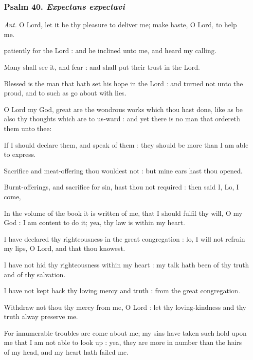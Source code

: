 \subsubsection{Psalm 40. \textit{Expectans expectavi}}\par\noindent
\textit{Ant.} O Lord, {\dag} let it be thy pleasure to deliver me; make haste, O Lord, to help me.\par
{} patiently for the Lord : and he inclined unto me, and heard my calling.\par
{}
Many shall see it, and fear : and shall put their trust in the Lord.\par
{}Blessed is the man that hath set his hope in the Lord : and turned not unto the proud, and to such as go about with lies.\par
{}O Lord my God, great are the wondrous works which thou hast done, like as be also thy thoughts which are to us-ward : and yet there is no man that ordereth them unto thee:\par
{}If I should declare them, and speak of them : they should be more than I am able to express.\par
{}Sacrifice and meat-offering thou wouldest not : but mine ears hast thou opened.\par
{}Burnt-offerings, and sacrifice for sin, hast thou not required : then said I, Lo, I come,\par
{}In the volume of the book it is written of me, that I should fulfil thy will, O my God : I am content to do it; yea, thy law is within my heart.\par
{}I have declared thy righteousness in the great congregation : lo, I will not refrain my lips, O Lord, and that thou knowest.\par
{}I have not hid thy righteousness within my heart : my talk hath been of thy truth and of thy salvation.\par
{}I have not kept back thy loving mercy and truth : from the great congregation.\par
{}Withdraw not thou thy mercy from me, O Lord : let thy loving-kindness and thy truth alway preserve me.\par
{}For innumerable troubles are come about me; my sins have taken such hold upon me that I am not able to look up : yea, they are more in number than the hairs of my head, and my heart hath failed me.\par
